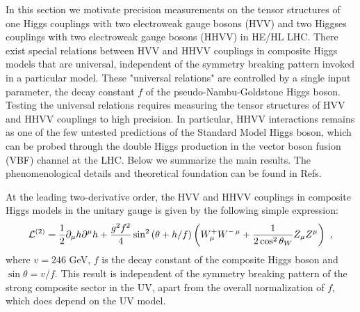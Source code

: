 
In this section we motivate precision measurements on the tensor structures of one Higgs couplings with two electroweak gauge bosons (HVV) and two Higgses couplings with two electroweak gauge bosons (HHVV) in HE/HL LHC. There exist special relations between HVV and HHVV couplings in composite Higgs models that are universal, independent of the  symmetry breaking pattern invoked in a particular model. These "universal relations" are controlled by a single input parameter, the decay constant $f$ of the pseudo-Nambu-Goldstone Higgs boson. Testing the universal relations requires measuring the tensor structures of HVV and HHVV couplings to high precision.  In particular,  HHVV interactions remains as one of the few untested predictions of the Standard Model Higgs boson, which can be probed through the double Higgs production in the vector boson fusion (VBF) channel at the LHC. Below we summarize the main results. The phenomenological details and theoretical foundation can be found in Refs.~\cite{Low:2014nga,Low:2014oga,Liu:2018vel,Liu:2018qtb}



At the leading two-derivative order, the HVV and HHVV couplings in composite Higgs models in the unitary gauge is given by the following simple expression:
\begin{equation}
\label{eq:twod}
{\cal L}^{(2)} = \frac12 \partial_\mu h\partial^\mu h+\frac{g^2f^2}{4}\sin^2\left(\theta+h/f\right)\left(W_\mu^+W^{-\, \mu}+\frac1{2\cos^2\theta_W}Z_\mu Z^\mu\right)\ ,
\end{equation}
where  $v=246$ GeV, $f$ is the decay constant of the composite Higgs boson and $\sin\theta=v/f$. This result is independent of the symmetry breaking pattern of the strong composite sector in the UV, apart from the overall normalization of $f$, which does depend on the UV model.

